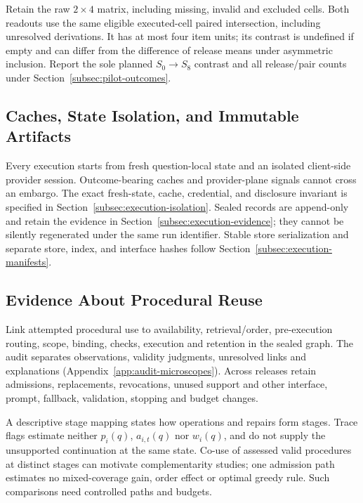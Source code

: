 \documentclass[10pt]{article} %
\providecommand{\1}{\mathbf{1}}  %
\theoremstyle{remark}
\theoremstyle{definition}
\begin{document}
Retain the raw $2\times4$ matrix, including missing, invalid and excluded
cells. Both readouts use the same eligible executed-cell paired intersection,
including unresolved derivations. It has at most four item units; its
contrast is undefined if empty and can differ from the difference of release
means under asymmetric inclusion. Report the sole planned $S_0\to S_8$
contrast and all release/pair counts under
Section~\ref{subsec:pilot-outcomes}.

\subsection{Caches, State Isolation, and Immutable Artifacts}

\label{subsec:pilot-isolation}

Every execution starts from fresh question-local state and an isolated
client-side provider session. Outcome-bearing caches and provider-plane
signals cannot cross an embargo. The exact fresh-state, cache, credential,
and disclosure invariant is specified in Section~\ref{subsec:execution-isolation}.
Sealed records are append-only and retain the evidence in
Section~\ref{subsec:execution-evidence}; they cannot be silently regenerated
under the same run identifier. Stable store serialization and separate
store, index, and interface hashes follow
Section~\ref{subsec:execution-manifests}.

\subsection{Evidence About Procedural Reuse}
\label{subsec:pilot-reuse-evidence}

Link attempted procedural use to availability, retrieval/order, pre-execution
routing, scope, binding, checks, execution and retention in the sealed graph.
The audit separates observations, validity judgments, unresolved links and
explanations (Appendix~\ref{app:audit-microscopes}). Across releases retain
admissions, replacements, revocations, unused support and other interface,
prompt, fallback, validation, stopping and budget changes.

A descriptive stage mapping states how operations and repairs form stages.
Trace flags estimate neither $p_i(q)$, $a_{i,t}(q)$ nor $w_i(q)$, and do not
supply the unsupported continuation at the same state. Co-use of assessed
valid procedures at distinct stages can motivate complementarity studies;
one admission path estimates no mixed-coverage gain, order effect or optimal
greedy rule. Such comparisons need controlled paths and budgets.
\end{document}
